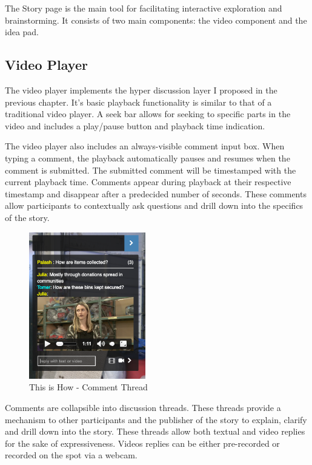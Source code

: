 The Story page is the main tool for facilitating interactive exploration and brainstorming. It consists of two main components: the video component and the idea pad.

\subsection{Video Player}

The video player implements the hyper discussion layer I proposed in the previous chapter. It's basic playback functionality is similar to that of a traditional video player. A seek bar allows for seeking to specific parts in the video and includes a play/pause button and playback time indication.

The video player also includes an always-visible comment input box. When typing a comment, the playback automatically pauses and resumes when the comment is submitted. The submitted comment will be timestamped with the current playback time. Comments appear during playback at their respective timestamp and disappear after a predecided number of seconds. These comments allow participants to contextually ask questions and drill down into the specifics of the story.  

   \begin{figure}[thpb]
      \centering
      \includegraphics[width=2in]{figures/commentthread.png}
      \caption{This is How - Comment Thread}
      \label{fig_comment_thread}
   \end{figure}

Comments are collapsible into discussion threads. These threads provide a mechanism to other participants and the publisher of the story to explain, clarify and drill down into the story. These threads allow both textual and video replies for the sake of expressiveness. Videos replies can be either pre-recorded or recorded on the spot via a webcam. 

